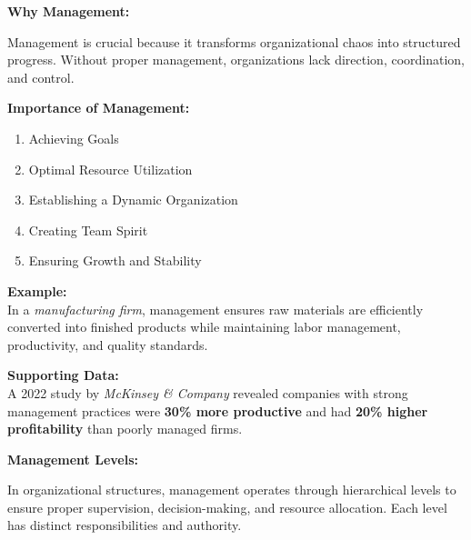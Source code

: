 \documentclass[12pt,a4paper]{book}
\begin{document}
\textbf{Why Management:}

Management is crucial because it transforms organizational chaos into structured progress. Without proper management, organizations lack direction, coordination, and control.

\textbf{Importance of Management:}
\begin{enumerate}
    \item Achieving Goals
    \item Optimal Resource Utilization
    \item Establishing a Dynamic Organization
    \item Creating Team Spirit
    \item Ensuring Growth and Stability
\end{enumerate}

\textbf{Example:}\\
In a \textit{manufacturing firm}, management ensures raw materials are efficiently converted into finished products while maintaining labor management, productivity, and quality standards.

\textbf{Supporting Data:}\\
A 2022 study by \textit{McKinsey \& Company} revealed companies with strong management practices were \textbf{30\% more productive} and had \textbf{20\% higher profitability} than poorly managed firms.


\textbf{Management Levels:}

In organizational structures, management operates through hierarchical levels to ensure proper supervision, decision-making, and resource allocation. Each level has distinct responsibilities and authority.
\end{document}

